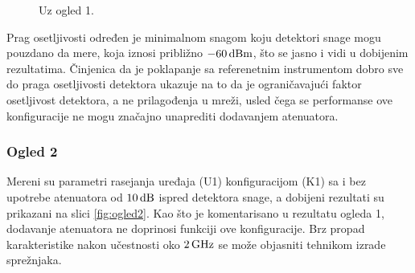\documentclass[a4paper, 12pt, diplomski]{etf}
\renewcommand{\unit}[1]{\,{\rm #1}}   %
\begin{document}
\begin{figure}[ht!]
\begin{subfigure}[b]{0.49\textwidth}
        \label{fig:s21_bpf}
    \end{subfigure}
    \caption{Uz ogled 1.}
    \label{fig:ogled1}
\end{figure}
%
Prag osetljivosti određen je minimalnom snagom
koju detektori snage mogu pouzdano da mere, koja
iznosi približno $-60\unit{dBm}$, što se 
jasno i vidi u dobijenim rezultatima. Činjenica da 
je poklapanje sa referenetnim instrumentom dobro
sve do praga osetljivosti detektora ukazuje na
to da je ograničavajući faktor osetljivost 
detektora, a ne prilagođenja u mreži, usled čega 
se performanse ove konfiguracije ne mogu značajno
unaprediti dodavanjem atenuatora.

\subsubsection{Ogled 2}
Mereni su parametri rasejanja uređaja (U1) 
konfiguracijom (K1) sa i bez upotrebe atenuatora  
od $10\unit{dB}$
ispred detektora snage, a
dobijeni rezultati su
prikazani na slici \ref{fig:ogled2}. Kao
što je komentarisano u rezultatu ogleda 1, 
dodavanje atenuatora ne doprinosi funkciji 
ove konfiguracije. 
Brz propad karakteristike nakon učestnosti oko 
$2\unit{GHz}$ se može objasniti tehnikom 
izrade sprežnjaka.
\end{document}
